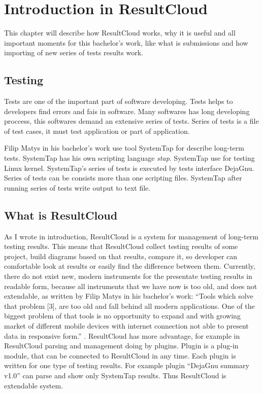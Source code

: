 \chapter{Introduction in ResultCloud}
\label{ch:resultcloud}

This chapter will describe how ResultCloud works, why it is useful and all important moments for this bachelor's work, like what is submissions and how importing of new series of tests results work.

\section{Testing}

Tests are one of the important part of software developing. Tests helps to developers find errors and fais in software. Many softwares has long developing proccess, this softwares demand an extensive series of tests. Series of tests is a file of test cases, it must test application or part of application.

Filip Matys in his bachelor's work use tool SystemTap for describe long-term tests. SystemTap has his own scripting language \emph{stap}. SystemTap use for testing Linux kernel. SystemTap's series of tests is executed by tests interface DejaGnu. Series of tests can be consists more than one scripting files. SystemTap after running series of tests write output to text file.  

\section{What is ResultCloud}

As I wrote in introduction, ResultCloud is a system for management of long-term testing results. This means that ResultCloud collect testing results of some project, build diagrams based on that results, compare it, so developer can comfortable look at results or easily find the difference between them. Currently, there do not exist new, modern instruments for the presentate testing results in readable form, because all instruments that we have now is too old, and does not extendable, as written by Filip Matys in his bachelor's work: “Tools which solve that problem [3], are too old and fall behind all modern applications. One of the biggest problem of that tools is no opportunity to expand and with growing market of different mobile devices with internet connection not able to present data in responsive form.” \cite{filip}. ResultCloud has more advantage, for example in ResultCloud parsing and management doing by plugins. Plugin is a plug-in module, that can be connected to ResultCloud in any time. Each plugin is written for one type of testing results. For example plugin “DejaGnu summary v1.0” can parse and show only SystemTap results. Thus ResultCloud is extendable system.

